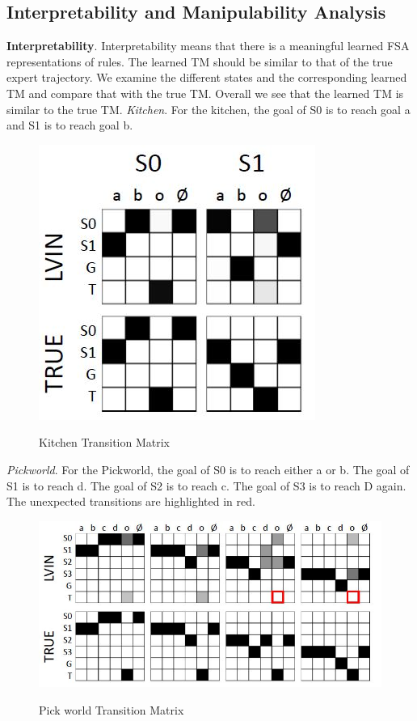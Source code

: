 \documentclass[letterpaper, 10 pt, conference]{ieeeconf}  %
\begin{document}
\subsection{Interpretability and Manipulability Analysis}
\textbf{Interpretability}. Interpretability means that there is a meaningful learned FSA representations of rules. The learned TM should be similar to that of the true expert trajectory. We examine the different states and the corresponding learned TM and compare that with the true TM. Overall we see that the learned TM is similar to the true TM.
\newline
\newline
\textit{Kitchen}. For the kitchen, the goal of S0 is to reach goal a and S1 is to reach goal b.
\begin{figure}[h]
 \centering
 \includegraphics[scale=.6]{KitchenTM.JPG}\\
 \caption{Kitchen Transition Matrix}
\end{figure}
\newline
\textit{Pickworld}. For the Pickworld, the goal of S0 is to reach either a or b. The goal of S1 is to reach d. The goal of S2 is to reach c. The goal of S3 is to reach D again. The unexpected transitions are highlighted in red.
\newline
\begin{figure}[h]
 \centering
 \includegraphics[scale=.4]{PickworldTM.JPG}\\
 \caption{Pick world Transition Matrix}
\end{figure}
\end{document}
